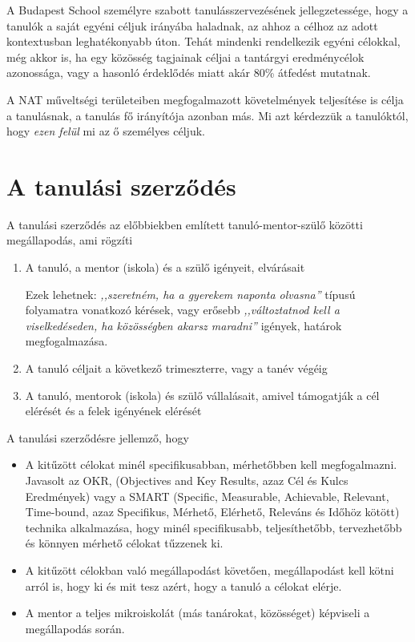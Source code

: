 A Budapest School személyre szabott tanulásszervezésének jellegzetessége, hogy a tanulók a saját egyéni céljuk irányába haladnak, az ahhoz a célhoz az adott kontextusban leghatékonyabb úton. Tehát mindenki rendelkezik egyéni célokkal, még akkor is, ha egy közösség tagjainak céljai a tantárgyi eredménycélok azonossága, vagy a hasonló érdeklődés miatt akár  80\% átfedést mutatnak.

A NAT műveltségi területeiben megfogalmazott követelmények teljesítése is célja a tanulásnak, a tanulás fő irányítója azonban más. Mi azt kérdezzük a tanulóktól, hogy \emph{ezen felül} mi az ő személyes céljuk.

\section{A tanulási szerződés}


A tanulási szerződés az előbbiekben említett tanuló-mentor-szülő közötti megállapodás, ami rögzíti
\begin{enumerate}
\item A tanuló, a mentor (iskola) és a szülő igényeit, elvárásait

    Ezek lehetnek: \emph{,,szeretném, ha a gyerekem naponta olvasna''} típusú folyamatra vonatkozó kérések, vagy erősebb \emph{,,változtatnod kell a viselkedéseden, ha közösségben akarsz maradni''} igények, határok megfogalmazása.

\item A tanuló céljait a következő trimeszterre, vagy a tanév végéig

\item A tanuló, mentorok (iskola) és szülő vállalásait, amivel támogatják a cél elérését és a felek igényének elérését

\end{enumerate}

A tanulási szerződésre jellemző, hogy
\begin{itemize}
\item A kitűzött célokat minél specifikusabban, mérhetőbben kell megfogalmazni. Javasolt az OKR,  (Objectives and Key Results, azaz  Cél és Kulcs Eredmények)\cite{okr} vagy a SMART (Specific, Measurable, Achievable, Relevant, Time-bound, azaz Specifikus,  Mérhető, Elérhető, Releváns és Időhöz kötött)\cite{wiki:smart} technika alkalmazása, hogy minél specifikusabb, teljesíthetőbb, tervezhetőbb és könnyen mérhető célokat tűzzenek ki.

\item A kitűzött célokban való megállapodást követően, megállapodást  kell kötni arról is, hogy ki és mit tesz azért, hogy a tanuló a célokat elérje.

\item A mentor a teljes mikroiskolát (más tanárokat, közösséget) képviseli a megállapodás során.
\end{itemize}

